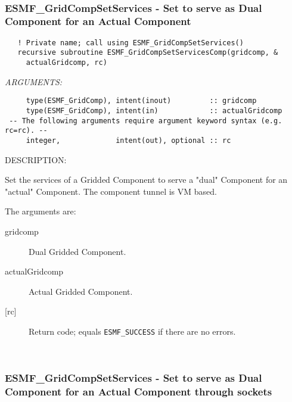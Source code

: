  
\mbox{}\hrulefill\ 
 
\subsubsection [ESMF\_GridCompSetServices] {ESMF\_GridCompSetServices - Set to serve as Dual Component for an Actual Component}


  
\begin{verbatim}   ! Private name; call using ESMF_GridCompSetServices()
   recursive subroutine ESMF_GridCompSetServicesComp(gridcomp, &
     actualGridcomp, rc)\end{verbatim}{\em ARGUMENTS:}
\begin{verbatim}     type(ESMF_GridComp), intent(inout)         :: gridcomp
     type(ESMF_GridComp), intent(in)            :: actualGridcomp
 -- The following arguments require argument keyword syntax (e.g. rc=rc). --
     integer,             intent(out), optional :: rc\end{verbatim}
{\sf DESCRIPTION:\\ }


   Set the services of a Gridded Component to serve a "dual" Component for an
   "actual" Component. The component tunnel is VM based.
  
   The arguments are:
   \begin{description}
   \item[gridcomp]
     Dual Gridded Component.
   \item[actualGridcomp]
     Actual Gridded Component.
   \item[{[rc]}]
     Return code; equals {\tt ESMF\_SUCCESS} if there are no errors.
   \end{description}
   
 
\mbox{}\hrulefill\ 
 
\subsubsection [ESMF\_GridCompSetServices] {ESMF\_GridCompSetServices - Set to serve as Dual Component for an Actual Component through sockets}


